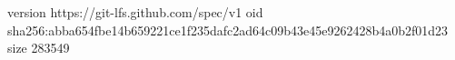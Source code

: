 version https://git-lfs.github.com/spec/v1
oid sha256:abba654fbe14b659221ce1f235dafc2ad64c09b43e45e9262428b4a0b2f01d23
size 283549

